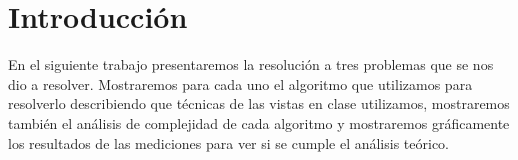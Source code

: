 \section{Introducci\'on}
En el siguiente trabajo presentaremos la resolución a tres problemas que se nos dio a resolver. Mostraremos para cada uno
el algoritmo que utilizamos para resolverlo describiendo que técnicas de las vistas en clase utilizamos, mostraremos también
el análisis de complejidad de cada algoritmo y mostraremos gráficamente los resultados de las mediciones para ver si se cumple el análisis 
teórico.

